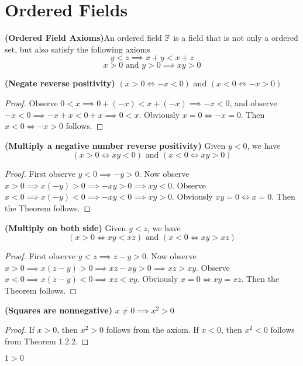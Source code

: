 \documentclass{report}
\begin{document}
\section{Ordered Fields}
\begin{definition}
\textbf{(Ordered Field Axioms)}An ordered field $\mathbb{F}$ is a field that is not only a ordered set, but also satisfy the following axioms
\begin{equation}
y<z\implies x+y<x+z
\end{equation}
\begin{equation}
x>0\text{ and }y>0\implies xy>0
\end{equation}
\end{definition}
\begin{theorem}
\textbf{(Negate reverse positivity)} $(x>0\iff -x<0)\text{ and }(x<0\iff -x>0)$
\end{theorem}
\begin{proof}
  Observe $
  0<x\implies 0+(-x)<x+(-x)\implies -x<0 $, and observe $
-x<0\implies -x+x<0+x\implies 0<x$. Obviously $x=0\iff -x=0$. Then $x<0\iff -x>0$ follows.
\end{proof}
\begin{theorem}
\textbf{(Multiply a negative number reverse positivity)} Given $y<0$, we have
\begin{equation}
  (x>0\iff xy<0)\text{ and }(x<0\iff xy>0)
\end{equation}
\end{theorem}
\begin{proof}
First observe $y<0\implies -y>0$. Now observe $x>0\implies x(-y)>0\implies -xy>0\implies xy<0$. Observe  
$x<0\implies x(-y)<0\implies -xy<0\implies xy>0$. Obviously $xy=0\iff x=0$. Then the Theorem follows. 
\end{proof}
\begin{theorem}
\textbf{(Multiply on both side)}  Given $y<z$, we have
\begin{equation}
  (x>0\iff xy<xz)\text{ and }(x<0\iff xy>xz)
\end{equation}
\end{theorem}
\begin{proof}
First observe $y<z\implies z-y>0$. Now observe $x>0\implies x(z-y)>0\implies xz-xy>0\implies xz>xy$. 
Observe  $x<0\implies x(z-y)<0\implies xz<xy$. Obviously $x=0\iff xy=xz$. Then the Theorem follows.
\end{proof}
\begin{theorem}
  \textbf{(Squares are nonnegative)} $x\neq 0\implies x^2>0$
\end{theorem}
\begin{proof}
If $x>0$, then $x^2>0$ follows from the axiom. If $x<0$, then $x^2<0$ follows from Theorem 1.2.2.
\end{proof}
\begin{corollary}
$1>0$
\end{corollary}
\end{document}

